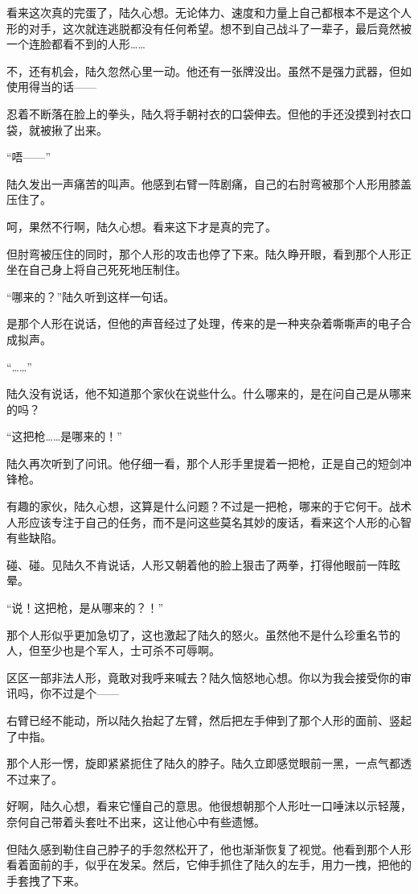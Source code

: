 看来这次真的完蛋了，陆久心想。无论体力、速度和力量上自己都根本不是这个人形的对手，这次就连逃脱都没有任何希望。想不到自己战斗了一辈子，最后竟然被一个连脸都看不到的人形……

不，还有机会，陆久忽然心里一动。他还有一张牌没出。虽然不是强力武器，但如使用得当的话——

忍着不断落在脸上的拳头，陆久将手朝衬衣的口袋伸去。但他的手还没摸到衬衣口袋，就被揪了出来。

“唔——”

陆久发出一声痛苦的叫声。他感到右臂一阵剧痛，自己的右肘弯被那个人形用膝盖压住了。

呵，果然不行啊，陆久心想。看来这下才是真的完了。

但肘弯被压住的同时，那个人形的攻击也停了下来。陆久睁开眼，看到那个人形正坐在自己身上将自己死死地压制住。

“哪来的？”陆久听到这样一句话。

是那个人形在说话，但他的声音经过了处理，传来的是一种夹杂着嘶嘶声的电子合成拟声。

“……”

陆久没有说话，他不知道那个家伙在说些什么。什么哪来的，是在问自己是从哪来的吗？

“这把枪……是哪来的！”

陆久再次听到了问讯。他仔细一看，那个人形手里提着一把枪，正是自己的短剑冲锋枪。

有趣的家伙，陆久心想，这算是什么问题？不过是一把枪，哪来的于它何干。战术人形应该专注于自己的任务，而不是问这些莫名其妙的废话，看来这个人形的心智有些缺陷。

碰、碰。见陆久不肯说话，人形又朝着他的脸上狠击了两拳，打得他眼前一阵眩晕。

“说！这把枪，是从哪来的？！”

那个人形似乎更加急切了，这也激起了陆久的怒火。虽然他不是什么珍重名节的人，但至少也是个军人，士可杀不可辱啊。

区区一部非法人形，竟敢对我呼来喊去？陆久恼怒地心想。你以为我会接受你的审讯吗，你不过是个——

右臂已经不能动，所以陆久抬起了左臂，然后把左手伸到了那个人形的面前、竖起了中指。

那个人形一愣，旋即紧紧扼住了陆久的脖子。陆久立即感觉眼前一黑，一点气都透不过来了。

好啊，陆久心想，看来它懂自己的意思。他很想朝那个人形吐一口唾沫以示轻蔑，奈何自己带着头套吐不出来，这让他心中有些遗憾。

但陆久感到勒住自己脖子的手忽然松开了，他也渐渐恢复了视觉。他看到那个人形看着面前的手，似乎在发呆。然后，它伸手抓住了陆久的左手，用力一拽，把他的手套拽了下来。

